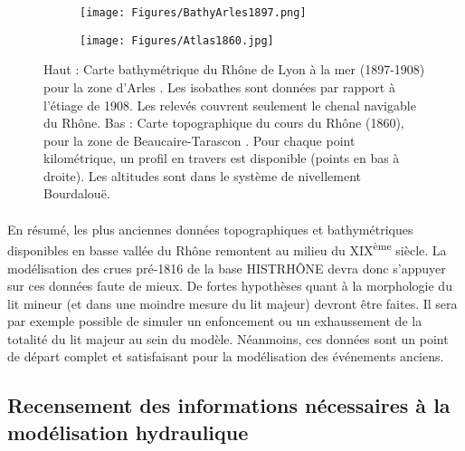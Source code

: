 \documentclass[11pt]{article}
\begin{document}
	\begin{figure}[h]
		\centering
		\begin{subfigure}{.7\linewidth}
			\texttt{[image: Figures/BathyArles1897.png]}
		\end{subfigure}
		\begin{subfigure}{0.7\linewidth}
			\texttt{[image: Figures/Atlas1860.jpg]}
		\end{subfigure}
		\caption{Haut : Carte bathymétrique du Rhône de Lyon à la mer (1897-1908) pour la zone d'Arles \citep{cnr_cartes_1908}. Les isobathes sont données par rapport à l'étiage de 1908. Les relevés couvrent seulement le chenal navigable du Rhône. Bas : Carte topographique du cours du Rhône (1860), pour la zone de Beaucaire-Tarascon \citep{cnr_carte_1876}. Pour chaque point kilométrique, un profil en travers est disponible (points en bas à droite). Les altitudes sont dans le système de nivellement Bourdalouë.}
		\label{fig:BathyTopo}
	\end{figure}
	
	\paragraph{} En résumé, les plus anciennes données topographiques et bathymétriques disponibles en basse vallée du Rhône remontent au milieu du XIX\textsuperscript{ème} siècle. La modélisation des crues pré-1816 de la base HISTRHÔNE devra donc s'appuyer sur ces données faute de mieux. De fortes hypothèses quant à la morphologie du lit mineur (et dans une moindre mesure du lit majeur) devront être faites. Il sera par exemple possible de simuler un enfoncement ou un exhaussement de la totalité du lit majeur au sein du modèle. Néanmoins, ces données sont un point de départ complet et satisfaisant pour la modélisation des événements anciens. 
	
\FloatBarrier	
	
	\subsection{Recensement des informations nécessaires à la modélisation hydraulique} 
	
\end{document}
